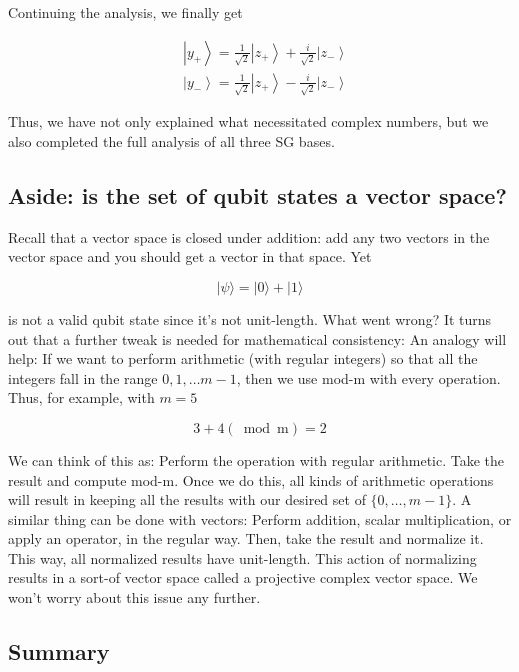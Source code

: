 \documentclass[main.tex]{subfiles}
\begin{document}
    Continuing the analysis, we finally get
    
    $$
    \begin{aligned}
    &\left|y_{+}\right\rangle=\frac{1}{\sqrt{2}}\left|z_{+}\right\rangle+\frac{i}{\sqrt{2}}\left|z_{-}\right\rangle \\
    &\left|y_{-}\right\rangle=\frac{1}{\sqrt{2}}\left|z_{+}\right\rangle-\frac{i}{\sqrt{2}}\left|z_{-}\right\rangle
    \end{aligned}
    $$
    
    Thus, we have not only explained what necessitated complex numbers, but we also completed the full analysis of all three SG bases.

\subsection{Aside: is the set of qubit states a vector space?}

    Recall that a vector space is closed under addition: add any two vectors in the vector space and you should get a vector in that space. Yet
    
    $$
    |\psi\rangle=|0\rangle+|1\rangle
    $$
    
    is not a valid qubit state since it's not unit-length. What went wrong? It turns out that a further tweak is needed for mathematical consistency: An analogy will help: If we want to perform arithmetic (with regular integers) so that all the integers fall in the range $0,1, \ldots m-1$, then we use mod-m with every operation. Thus, for example, with $m=5$
    
    $$
    3+4(\bmod \mathrm{m})=2
    $$
    
    We can think of this as: Perform the operation with regular arithmetic. Take the result and compute mod-m. Once we do this, all kinds of arithmetic operations will result in keeping all the results with our desired set of $\{0, \ldots, m-1\}$. A similar thing can be done with vectors: Perform addition, scalar multiplication, or apply an operator, in the regular way. Then, take the result and normalize it. This way, all normalized results have unit-length. This action of normalizing results in a sort-of vector space called a projective complex vector space. We won't worry about this issue any further.

\subsection{Summary}
\end{document}
